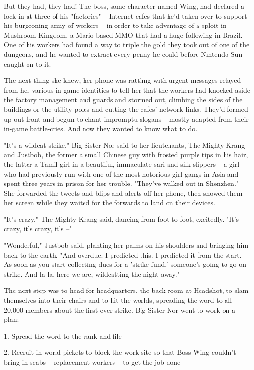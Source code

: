 But they had, they had! The boss, some character named Wing, had
declared a lock-in at three of his "factories" -- Internet cafes
that he'd taken over to support his burgeoning army of workers --
in order to take advantage of a sploit in Mushroom Kingdom, a
Mario-based MMO that had a huge following in Brazil. One of his
workers had found a way to triple the gold they took out of one of
the dungeons, and he wanted to extract every penny he could before
Nintendo-Sun caught on to it.

The next thing she knew, her phone was rattling with urgent
messages relayed from her various in-game identities to tell her
that the workers had knocked aside the factory management and
guards and stormed out, climbing the sides of the buildings or the
utility poles and cutting the cafes' network links. They'd formed
up out front and begun to chant impromptu slogans -- mostly adapted
from their in-game battle-cries. And now they wanted to know what
to do.

"It's a wildcat strike," Big Sister Nor said to her lieutenants,
The Mighty Krang and Justbob, the former a small Chinese guy with
frosted purple tips in his hair, the latter a Tamil girl in a
beautiful, immaculate sari and silk slippers -- a girl who had
previously run with one of the most notorious girl-gangs in Asia
and spent three years in prison for her trouble. "They've walked
out in Shenzhen." She forwarded the tweets and blips and alerts off
her phone, then showed them her screen while they waited for the
forwards to land on their devices.

"It's crazy," The Mighty Krang said, dancing from foot to foot,
excitedly. "It's crazy, it's crazy, it's --"

"Wonderful," Justbob said, planting her palms on his shoulders and
bringing him back to the earth. "And overdue. I predicted this. I
predicted it from the start. As soon as you start collecting dues
for a 'strike fund,' someone's going to go on strike. And la-la,
here we are, wildcatting the night away."

The next step was to head for headquarters, the back room at
Headshot, to slam themselves into their chairs and to hit the
worlds, spreading the word to all 20,000 members about the
first-ever strike. Big Sister Nor went to work on a plan:

1. Spread the word to the rank-and-file

2. Recruit in-world pickets to block the work-site so that Boss
Wing couldn't bring in scabs -- replacement workers -- to get the
job done

